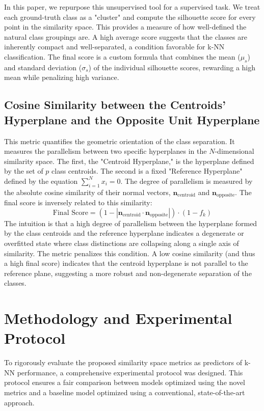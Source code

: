 \documentclass[conference]{IEEEtran}
\begin{document}
In this paper, we repurpose this unsupervised tool for a supervised task. We treat each ground-truth class as a "cluster" and compute the silhouette score for every point in the similarity space. This provides a measure of how well-defined the natural class groupings are. A high average score suggests that the classes are inherently compact and well-separated, a condition favorable for k-NN classification. The final score is a custom formula that combines the mean ($\mu_s$) and standard deviation ($\sigma_s$) of the individual silhouette scores, rewarding a high mean while penalizing high variance.

\subsection{Cosine Similarity between the Centroids' Hyperplane and the Opposite Unit Hyperplane}
This metric quantifies the geometric orientation of the class separation. It measures the parallelism between two specific hyperplanes in the $N$-dimensional similarity space. The first, the "Centroid Hyperplane," is the hyperplane defined by the set of $p$ class centroids. The second is a fixed "Reference Hyperplane" defined by the equation $\sum_{i=1}^{N} x_i = 0$. The degree of parallelism is measured by the absolute cosine similarity of their normal vectors, $\mathbf{n}_{\text{centroid}}$ and $\mathbf{n}_{\text{opposite}}$. The final score is inversely related to this similarity:
$$ \text{Final Score} = (1 - |\mathbf{n}_{\text{centroid}} \cdot \mathbf{n}_{\text{opposite}}|) \cdot (1 - f_k) $$
The intuition is that a high degree of parallelism between the hyperplane formed by the class centroids and the reference hyperplane indicates a degenerate or overfitted state where class distinctions are collapsing along a single axis of similarity. The metric penalizes this condition. A low cosine similarity (and thus a high final score) indicates that the centroid hyperplane is not parallel to the reference plane, suggesting a more robust and non-degenerate separation of the classes.

\section{Methodology and Experimental Protocol}
To rigorously evaluate the proposed similarity space metrics as predictors of k-NN performance, a comprehensive experimental protocol was designed. This protocol ensures a fair comparison between models optimized using the novel metrics and a baseline model optimized using a conventional, state-of-the-art approach.
\end{document}
